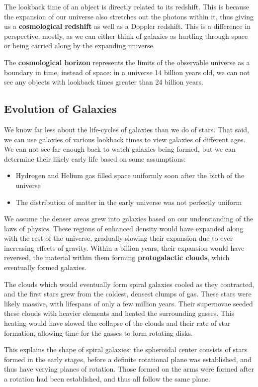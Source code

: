 The lookback time of an object is directly related to its redshift. This is because the expansion of our universe also stretches out the photons within it, thus giving us a {\bf cosmological redshift} as well as a Doppler redshift. This is a difference in perspective, mostly, as we can either think of galaxies as hurtling through space or being carried along by the expanding universe.

The {\bf cosmological horizon} represents the limits of the observable universe as a boundary in time, instead of space: in a universe 14 billion years old, we can not see any objects with lookback times greater than 24 billion years.

\subsection{Evolution of Galaxies}
We know far less about the life-cycles of galaxies than we do of stars. That said, we can use galaxies of various lookback times to view galaxies of different ages. We can not see far enough back to watch galaxies being formed, but we can determine their likely early life based on some assumptions:
\begin{itemize}
\item Hydrogen and Helium gas filled space uniformly soon after the birth of the universe
\item The distribution of matter in the early universe was not perfectly uniform
\end{itemize}

We assume the denser areas grew into galaxies based on our understanding of the laws of physics. These regions of enhanced density would have expanded along with the rest of the universe, gradually slowing their expansion due to ever-increasing effects of gravity. Within a billion years, their expansion would have reversed, the material within them forming {\bf protogalactic clouds}, which eventually formed galaxies.

The clouds which would eventually form spiral galaxies cooled as they contracted, and the first stars grew from the coldest, densest clumps of gas. These stars were likely massive, with lifespans of only a few million years. Their supernovae seeded these clouds with heavier elements and heated the surrounding gasses. This heating would have slowed the collapse of the clouds and their rate of star formation, allowing time for the gasses to form rotating disks.

This explains the shape of spiral galaxies: the spheroidal center consists of stars formed in the early stages, before a definite rotational plane was established, and thus have verying planes of rotation. Those formed on the arms were formed after a rotation had been established, and thus all follow the same plane.

